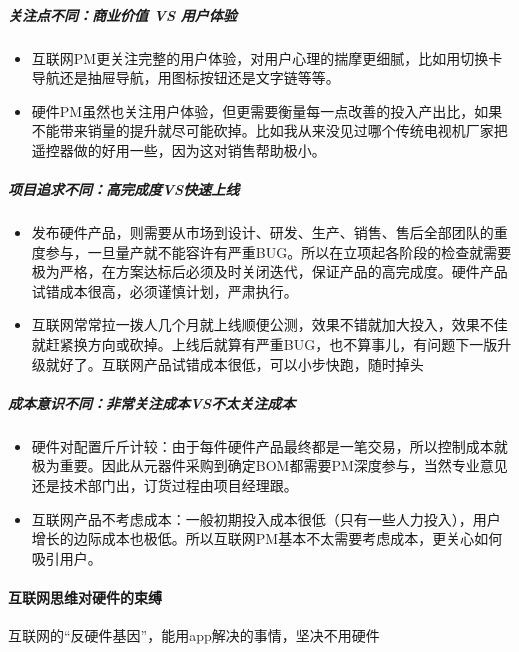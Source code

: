 \documentclass[letterpaper,11pt,english]{sphinxmanual}
\begin{document}
\subparagraph{关注点不同：商业价值 VS 用户体验}
\label{\detokenize{chapter_project/AI_hardware:vs}}\begin{itemize}
\item {} 
互联网PM更关注完整的用户体验，对用户心理的揣摩更细腻，比如用切换卡导航还是抽屉导航，用图标按钮还是文字链等等。

\item {} 
硬件PM虽然也关注用户体验，但更需要衡量每一点改善的投入产出比，如果不能带来销量的提升就尽可能砍掉。比如我从来没见过哪个传统电视机厂家把遥控器做的好用一些，因为这对销售帮助极小。

\end{itemize}


\subparagraph{项目追求不同：高完成度VS快速上线}
\label{\detokenize{chapter_project/AI_hardware:id5}}\begin{itemize}
\item {} 
发布硬件产品，则需要从市场到设计、研发、生产、销售、售后全部团队的重度参与，一旦量产就不能容许有严重BUG。所以在立项起各阶段的检查就需要极为严格，在方案达标后必须及时关闭迭代，保证产品的高完成度。硬件产品试错成本很高，必须谨慎计划，严肃执行。

\item {} 
互联网常常拉一拨人几个月就上线顺便公测，效果不错就加大投入，效果不佳就赶紧换方向或砍掉。上线后就算有严重BUG，也不算事儿，有问题下一版升级就好了。互联网产品试错成本很低，可以小步快跑，随时掉头

\end{itemize}


\subparagraph{成本意识不同：非常关注成本VS不太关注成本}
\label{\detokenize{chapter_project/AI_hardware:id6}}\begin{itemize}
\item {} 
硬件对配置斤斤计较：由于每件硬件产品最终都是一笔交易，所以控制成本就极为重要。因此从元器件采购到确定BOM都需要PM深度参与，当然专业意见还是技术部门出，订货过程由项目经理跟。

\item {} 
互联网产品不考虑成本：一般初期投入成本很低（只有一些人力投入），用户增长的边际成本也极低。所以互联网PM基本不太需要考虑成本，更关心如何吸引用户。

\end{itemize}


\paragraph{互联网思维对硬件的束缚}
\label{\detokenize{chapter_project/AI_hardware:id7}}
互联网的“反硬件基因”，能用app解决的事情，坚决不用硬件
\end{document}
